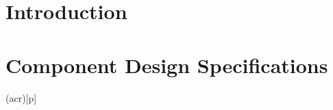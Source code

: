 \documentclass[a4paper,twoside,openright,makeidx,12pt]{book}
\begin{document}
\pagestyle{empty}
\renewcommand{\arraystretch}{1.8}



\tableofcontents


\pagestyle{fancy}
\cleardoublepage

\chapter{Introduction}
\label{Sec:DDD-Intoduction}


\newpage
\chapter{Component Design Specifications}
\label{Sec:DDD-ComponentDesignSpecification}



\newpage
\printglosstex(acr)[p]


\listoffigures
\listoftables
\cleardoublepage
%
%
\cleardoublepage
\end{document}
